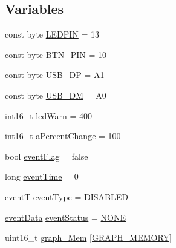 \subsection*{Variables}
\begin{DoxyCompactItemize}
\item 
const byte \hyperlink{_u_s_b___tester___o_l_e_d__128x64___beta__2_82_8ino_a39ad36e31538b25d5b6e19a972757032}{L\+E\+D\+P\+IN} = 13
\item 
const byte \hyperlink{_u_s_b___tester___o_l_e_d__128x64___beta__2_82_8ino_a19943d19def2dd315b897e30477e005f}{B\+T\+N\+\_\+\+P\+IN} = 10
\item 
const byte \hyperlink{_u_s_b___tester___o_l_e_d__128x64___beta__2_82_8ino_a3d1ed3f1f8c3b814b369c66b6043c697}{U\+S\+B\+\_\+\+DP} = A1
\item 
const byte \hyperlink{_u_s_b___tester___o_l_e_d__128x64___beta__2_82_8ino_a5b2a46462e9118644850f23dfd492e0b}{U\+S\+B\+\_\+\+DM} = A0
\item 
int16\+\_\+t \hyperlink{_u_s_b___tester___o_l_e_d__128x64___beta__2_82_8ino_affe77e3e21edc87aea088a9f6d9cacaa}{led\+Warn} = 400
\item 
int16\+\_\+t \hyperlink{_u_s_b___tester___o_l_e_d__128x64___beta__2_82_8ino_a0ded24b71b0e1155aec127b5ad3a2fbe}{a\+Percent\+Change} = 100
\item 
bool \hyperlink{_u_s_b___tester___o_l_e_d__128x64___beta__2_82_8ino_a180c7a1708e6dd8979c7de3825a5fc13}{event\+Flag} = false
\item 
long \hyperlink{_u_s_b___tester___o_l_e_d__128x64___beta__2_82_8ino_a5c60647f5c89105c46c7da6a11c08a55}{event\+Time} = 0
\item 
\hyperlink{_u_s_b___tester___o_l_e_d__128x64___beta__2_82_8ino_ab62a0b3e67d0cb40fc46d5cc2bca94e6}{eventT} \hyperlink{_u_s_b___tester___o_l_e_d__128x64___beta__2_82_8ino_aebfd20569b9702d969f1d07eecd61d6f}{event\+Type} = \hyperlink{_u_s_b___tester___o_l_e_d__128x64___beta__2_82_8ino_ab62a0b3e67d0cb40fc46d5cc2bca94e6a40f39385238042f6ec0cbac821a19fc4}{D\+I\+S\+A\+B\+L\+ED}
\item 
\hyperlink{_u_s_b___tester___o_l_e_d__128x64___beta__2_82_8ino_a4352b992f72197884da17c6d16b97734}{event\+Data} \hyperlink{_u_s_b___tester___o_l_e_d__128x64___beta__2_82_8ino_ae073e8e40ca4815db718d3e0a96ac632}{event\+Status} = \hyperlink{_u_s_b___tester___o_l_e_d__128x64___beta__2_82_8ino_a4352b992f72197884da17c6d16b97734ac157bdf0b85a40d2619cbc8bc1ae5fe2}{N\+O\+NE}
\item 
uint16\+\_\+t \hyperlink{_u_s_b___tester___o_l_e_d__128x64___beta__2_82_8ino_aaf58e6bb184673708ff9c2fd9f064de9}{graph\+\_\+\+Mem} \mbox{[}\hyperlink{_u_s_b___tester___o_l_e_d__128x64___beta__2_82_8ino_a2c0a8e83033b6e3ab82b31600463e2f8}{G\+R\+A\+P\+H\+\_\+\+M\+E\+M\+O\+RY}\mbox{]}

\end{DoxyCompactItemize}
